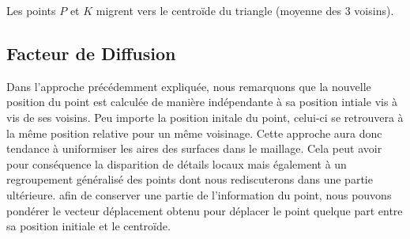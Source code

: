 \documentclass[11pt,a4paper]{article}
\begin{document}
\begin{center}
\end{center}

Les points $P$ et $K$ migrent vers le centroïde du triangle (moyenne des 3 voisins).



\subsection{Facteur de Diffusion}
Dans l'approche précédemment expliquée, nous remarquons que la nouvelle position du point est calculée de manière indépendante à sa position intiale vis à vis de ses voisins.
Peu importe la position initale du point, celui-ci se retrouvera à la même position relative pour un même voisinage.
Cette approche aura donc tendance à uniformiser les aires des surfaces dans le maillage. Cela peut avoir pour conséquence la disparition de détails locaux mais également à un regroupement généralisé des points dont nous rediscuterons dans une partie ultérieure.
afin de conserver une partie de l'information du point, nous pouvons pondérer le vecteur déplacement obtenu pour déplacer le point quelque part entre
sa position initiale et le centroïde. \\
\end{document}
